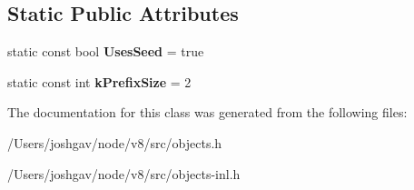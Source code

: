 \subsection*{Static Public Attributes}
\begin{DoxyCompactItemize}
\item 
static const bool {\bfseries Uses\+Seed} = true\hypertarget{classv8_1_1internal_1_1_seeded_number_dictionary_shape_aeef83de57b6cced5e74cd1032b9dd4c9}{}\label{classv8_1_1internal_1_1_seeded_number_dictionary_shape_aeef83de57b6cced5e74cd1032b9dd4c9}

\item 
static const int {\bfseries k\+Prefix\+Size} = 2\hypertarget{classv8_1_1internal_1_1_seeded_number_dictionary_shape_a25afb78928f0df8903f54cb9bd5c704b}{}\label{classv8_1_1internal_1_1_seeded_number_dictionary_shape_a25afb78928f0df8903f54cb9bd5c704b}

\end{DoxyCompactItemize}


The documentation for this class was generated from the following files\+:\begin{DoxyCompactItemize}
\item 
/\+Users/joshgav/node/v8/src/objects.\+h\item 
/\+Users/joshgav/node/v8/src/objects-\/inl.\+h\end{DoxyCompactItemize}

